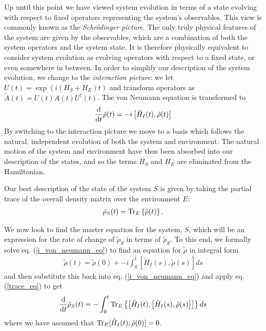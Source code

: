 Up until this point we have viewed system evolution in terms of a state evolving with respect to fixed operators representing the system's observables. This view is commonly known as the \textit{Schr\"odinger picture}. The only truly physical features of the system are given by the observables, which are a combination of both the system operators and the system state. It is therefore physically equivalent to consider system evolution as evolving operators with respect to a fixed state, or even somewhere in between. In order to simplify our description of the system evolution, we change to the \textit{interaction picture}: we let $U(t) = \exp(i(H_S + H_E)t)$ and transform operators as $\tilde{A}(t) = U(t)A(t)U^\dagger(t)$. The von Neumann equation is transformed to
\begin{align}
  \label{i_von_neumann_eq}
  \frac{\mathrm{d}}{\mathrm{d}t} \tilde{\rho}(t) = -i\left[ \tilde{H}_I(t), \tilde{\rho}(t) \right]
\end{align}
By switching to the interaction picture we move to a basis which follows the natural, independent evolution of both the system and environment. The natural motion of the system and environment have thus been absorbed into our description of the states, and so the terms $H_S$ and $H_E$ are eliminated from the Hamiltonian.

Our best description of the state of the system $S$ is given by taking the partial trace of the overall density matrix over the environment $E$:
\begin{align}
  \label{trace_eq}
  \tilde{\rho}_S(t) = \operatorname{Tr}_E\left\{\tilde{\rho}(t)\right\}.
\end{align}

We now look to find the master equation for the system, $S$, which will be an expression for the rate of change of $\tilde{\rho}_S$ in terms of $\tilde{\rho}_S$. To this end, we formally solve eq. (\ref{i_von_neumann_eq}) to find an equation for $\tilde{\rho}$ in integral form
\begin{align}
  \tilde{\rho}(t) = \tilde{\rho}(0) + -i\int_{0}^t \left[ \tilde{H}_I(s), \tilde{\rho}(s) \right] ds
\end{align}
and then substitute this back into eq. (\ref{i_von_neumann_eq}) and apply eq. (\ref{trace_eq}) to get
\begin{align}
  \label{before_markov_approx}
  \frac{\mathrm{d}}{\mathrm{d}t} \tilde{\rho}_S(t) = -\int_{0}^t \operatorname{Tr}_E\left\{ \left[ \tilde{H}_I(t), \left[ \tilde{H}_I(s), \tilde{\rho}(s) \right] \right] \right\} ds
\end{align}
where we have assumed that $\operatorname{Tr}_E [\tilde{H}_I(t), \tilde{\rho}(0)] = 0$.

